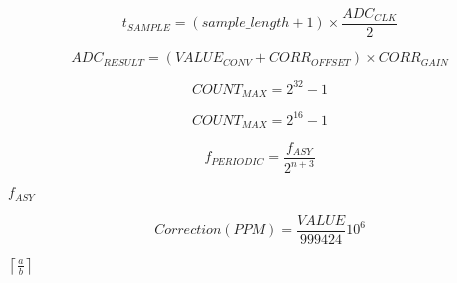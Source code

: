 \documentclass{article}
\begin{document}
\[
t_{SAMPLE} = (sample\_length+1) \times \frac{ADC_{CLK}} {2}
\]
\pagebreak

\[
ADC_{RESULT} = (VALUE_{CONV} + CORR_{OFFSET}) \times CORR_{GAIN}
\]
\pagebreak

\[ COUNT_{MAX} = 2^{32}-1 \]
\pagebreak

\[ COUNT_{MAX} = 2^{16}-1 \]
\pagebreak

\[ f_{PERIODIC}=\frac{f_{ASY}}{2^{n+3}} \]
\pagebreak

$f_{ASY}$
\pagebreak

\[ Correction(PPM) = \frac{VALUE}{999424}10^6 \]
\pagebreak

$ \left\lceil \frac{a}{b} \right\rceil $
\pagebreak
\end{document}
